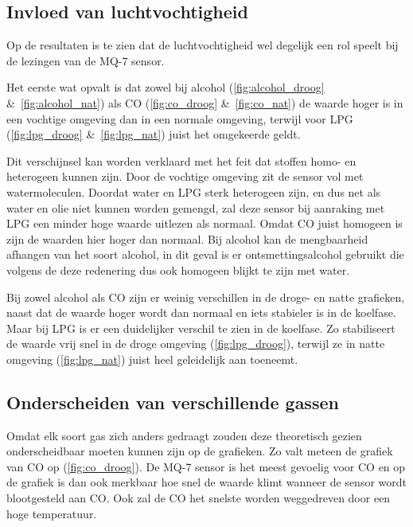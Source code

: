 \clearpage
\subsection{Invloed van luchtvochtigheid}
\label{subsec:invloed_hum}

Op de resultaten is te zien dat de luchtvochtigheid wel degelijk een rol speelt bij de lezingen van de MQ-7 sensor. 

Het eerste wat opvalt is dat zowel bij alcohol (\ref{fig:alcohol_droog} \&~\ref{fig:alcohol_nat}) als CO (\ref{fig:co_droog} \&~\ref{fig:co_nat}) de waarde hoger is in een vochtige omgeving dan in een normale omgeving, terwijl voor LPG (\ref{fig:lpg_droog} \&~\ref{fig:lpg_nat}) juist het omgekeerde geldt.

Dit verschijnsel kan worden verklaard met het feit dat stoffen homo- en heterogeen kunnen zijn.
Door de vochtige omgeving zit de sensor vol met watermoleculen. Doordat water en LPG sterk heterogeen zijn, en dus net als water en olie niet kunnen worden gemengd, zal deze sensor bij aanraking met LPG een minder hoge waarde uitlezen als normaal. Omdat CO juist homogeen is zijn de waarden hier hoger dan normaal. Bij alcohol kan de mengbaarheid afhangen van het soort alcohol, in dit geval is er ontsmettingsalcohol gebruikt die volgens de deze redenering dus ook homogeen blijkt te zijn met water.

Bij zowel alcohol als CO zijn er weinig verschillen in de droge- en natte grafieken, naast dat de waarde hoger wordt dan normaal en iets stabieler is in de koelfase. Maar bij LPG is er een duidelijker verschil te zien in de koelfase. Zo stabiliseert de waarde vrij snel in de droge omgeving (\ref{fig:lpg_droog}), terwijl ze in natte omgeving (\ref{fig:lpg_nat}) juist heel geleidelijk aan toeneemt.


\subsection{Onderscheiden van verschillende gassen}
\label{subsec:onderscheiding_gassen}


Omdat elk soort gas zich anders gedraagt zouden deze theoretisch gezien onderscheidbaar moeten kunnen zijn op de grafieken. Zo valt meteen de grafiek van CO op (\ref{fig:co_droog}). De MQ-7 sensor is het meest gevoelig voor CO en op de grafiek is dan ook merkbaar hoe snel de waarde klimt wanneer de sensor wordt blootgesteld aan CO. Ook zal de CO het snelste worden weggedreven door een hoge temperatuur.

